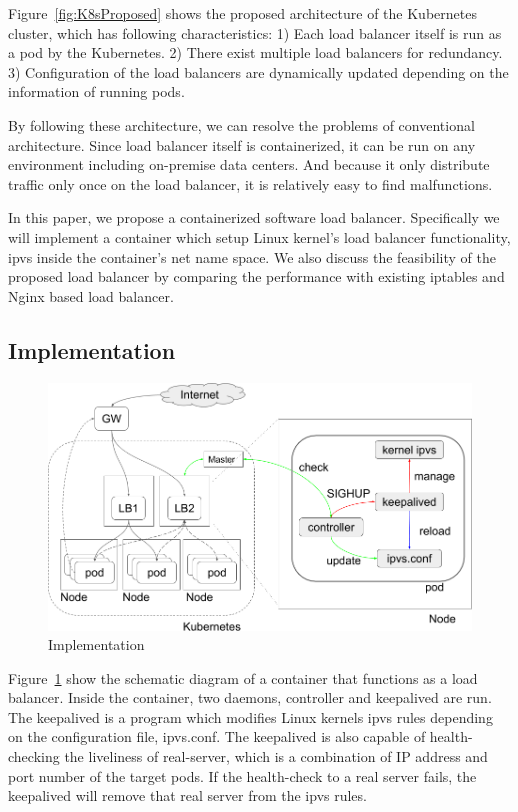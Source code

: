 Figure~\ref{fig:K8sProposed} shows the proposed architecture of the Kubernetes cluster, 
which has following characteristics:
1) Each load balancer itself is run as a pod by the Kubernetes. 
2) There exist multiple load balancers for redundancy. 
3) Configuration of the load balancers are dynamically updated depending on the information of running pods.

By following these architecture, we can resolve the problems of conventional architecture.
Since load balancer itself is containerized, it can be run on any environment including on-premise data centers.
And because it only distribute traffic only once on the load balancer, it is relatively easy to find malfunctions.

In this paper, we propose a containerized software load balancer. 
Specifically we will implement a container which setup Linux kernel's load balancer functionality, 
ipvs inside the container's net name space.
We also discuss the feasibility of the proposed load balancer by comparing the performance with existing iptables and Nginx based load balancer. 


\subsection{Implementation}\label{Implementation}

\begin{figure}
\includegraphics[width=\columnwidth]{Figs/ipvs-ingress-schem}
\caption{Implementation}
\label{fig:ipvs-ingress-schem}
\end{figure}

Figure~\ref{fig:ipvs-ingress-schem} show the schematic diagram of a container that functions as a load balancer.
Inside the container, two daemons, controller and keepalived are run.
The keepalived is a program which modifies Linux kernels ipvs rules depending on the configuration file, ipvs.conf.
The keepalived is also capable of health-checking the liveliness of real-server, 
which is a combination of IP address and port number of the target pods. 
If the health-check to a real server fails, the keepalived will remove that real server from the ipvs rules.

